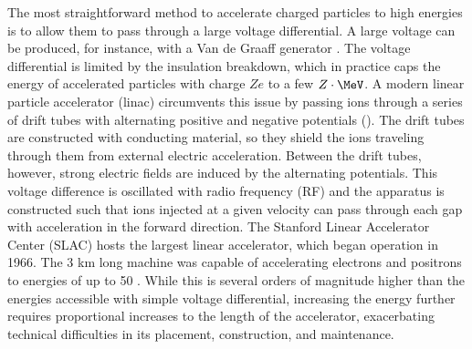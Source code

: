 The most straightforward method to accelerate charged particles to high energies is to allow them to pass through a large voltage differential.
A large voltage can be produced, for instance, with a Van de Graaff generator \cite{PhysRev.43.149}.
The voltage differential is limited by the insulation breakdown, which in practice caps the energy of accelerated particles with charge $Ze$ to a few $Z \cdot\MeV$.
A modern linear particle accelerator (linac) circumvents this issue by passing ions through a series of drift tubes with alternating positive and negative potentials ().
The drift tubes are constructed with conducting material, so they shield the ions traveling through them from external electric acceleration.
Between the drift tubes, however, strong electric fields are induced by the alternating potentials.
This voltage difference is oscillated with radio frequency (RF) and the apparatus is constructed such that ions injected at a given velocity can pass through each gap with acceleration in the forward direction.
The Stanford Linear Accelerator Center (SLAC) hosts the largest linear accelerator, which began operation in 1966.
The 3 km long machine was capable of accelerating electrons and positrons to energies of up to 50 \GeV.
While this is several orders of magnitude higher than the energies accessible with simple voltage differential, increasing the energy further requires proportional increases to the length of the accelerator, exacerbating technical difficulties in its placement, construction, and maintenance.

